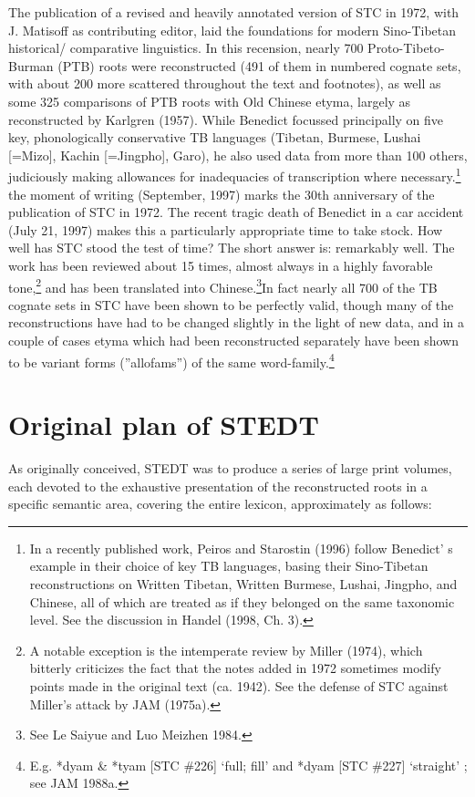 The publication of a revised and heavily annotated version of STC in 1972, with J. Matisoff as contributing editor, laid the foundations for modern Sino-Tibetan historical/ comparative linguistics. In this recension, nearly 700 Proto-Tibeto-Burman (PTB) roots were reconstructed (491 of them in numbered cognate sets, with about 200 more scattered throughout the text and footnotes), as well as some 325 comparisons of PTB roots with Old Chinese etyma, largely as reconstructed by Karlgren (1957). While Benedict focussed principally on five key, phonologically conservative TB languages (Tibetan, Burmese, Lushai [=Mizo], Kachin [=Jingpho], Garo), he also used data from more than 100 others, judiciously making allowances for inadequacies of transcription where necessary.\footnote{In a recently published work, Peiros and Starostin (1996) follow Benedict’ s example in their choice of key TB languages, basing their Sino-Tibetan reconstructions on Written Tibetan, Written Burmese, Lushai, Jingpho, and Chinese, all of which are treated as if they belonged on the same taxonomic level. See the discussion in Handel (1998, Ch. 3).} the moment of writing (September, 1997) marks the 30th anniversary of the publication of STC in 1972. The recent tragic death of Benedict in a car accident (July 21, 1997) makes this a particularly appropriate time to take stock. How well has STC stood the test of time? The short answer is: remarkably well. The work has been reviewed about 15 times, almost always in a highly favorable tone,\footnote{A notable exception is the intemperate review by Miller (1974), which bitterly criticizes the fact that the notes added in 1972 sometimes modify points made in the original text (ca. 1942). See the defense of STC against Miller’s attack by JAM (1975a).} and has been translated into Chinese.\footnote{See Le Saiyue and Luo Meizhen 1984.}In fact nearly all 700 of the TB cognate sets in STC have been shown to be perfectly valid, though many of the reconstructions have had to be changed slightly in the light of new data, and in a couple of cases etyma which had been reconstructed separately have been shown to be variant forms (”allofams”) of the same word-family.\footnote{E.g. *dyam \& *tyam [STC $\#$226] ‘full; fill’ and *dyam [STC $\#$227] ‘straight’ ; see JAM 1988a.}

\section{Original plan of STEDT}
As originally conceived, STEDT was to produce a series of large
print volumes, each devoted to the exhaustive presentation of the reconstructed
roots in a specific semantic area, covering the entire lexicon, approximately as
follows:


